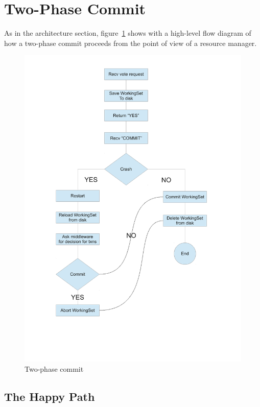 \documentclass[11pt]{article}
\begin{document}
\section{Two-Phase Commit}

As in the architecture section, figure~\ref{fig:2pc} shows with a
high-level flow diagram of how a two-phase commit proceeds from the
point of view of a resource manager.

\begin{figure}[H]
  \caption{Two-phase commit}
  \label{fig:2pc}

  \begin{center}
    \includegraphics[scale=0.5]{2pc.pdf}
  \end{center}
\end{figure}


\subsection{The Happy Path}
\end{document}
